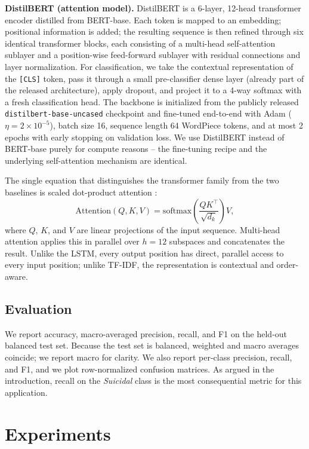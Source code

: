 \documentclass[12pt]{article}
\begin{document}
\textbf{DistilBERT (attention model).} DistilBERT
\cite{sanh2019distilbert} is a 6-layer, 12-head transformer encoder
distilled from BERT-base. Each token is mapped to an embedding;
positional information is added; the resulting sequence is then refined
through six identical transformer blocks, each consisting of a
multi-head self-attention sublayer and a position-wise feed-forward
sublayer with residual connections and layer normalization. For
classification, we take the contextual representation of the
\texttt{[CLS]} token, pass it through a small pre-classifier dense
layer (already part of the released architecture), apply dropout, and
project it to a 4-way softmax with a fresh classification head. The
backbone is initialized from the publicly released
\texttt{distilbert-base-uncased} checkpoint and fine-tuned end-to-end
with Adam ($\eta=2\!\times\!10^{-5}$), batch size 16, sequence length
64 WordPiece tokens, and at most 2 epochs with early stopping on
validation loss. We use DistilBERT instead of BERT-base purely for
compute reasons -- the fine-tuning recipe and the underlying
self-attention mechanism are identical.

The single equation that distinguishes the transformer family from the
two baselines is scaled dot-product attention
\cite{vaswani2017attention}:
\begin{equation}
\mathrm{Attention}(Q, K, V) = \mathrm{softmax}\!\left(\frac{Q K^{\top}}{\sqrt{d_k}}\right) V,
\end{equation}
where $Q$, $K$, and $V$ are linear projections of the input sequence.
Multi-head attention applies this in parallel over $h=12$ subspaces and
concatenates the result. Unlike the LSTM, every output position has
direct, parallel access to every input position; unlike TF-IDF, the
representation is contextual and order-aware.

\subsection{Evaluation}

We report accuracy, macro-averaged precision, recall, and F1 on the
held-out balanced test set. Because the test set is balanced, weighted
and macro averages coincide; we report macro for clarity. We also
report per-class precision, recall, and F1, and we plot row-normalized
confusion matrices. As argued in the introduction, recall on the
\textit{Suicidal} class is the most consequential metric for this
application.

\section{Experiments}
\end{document}
